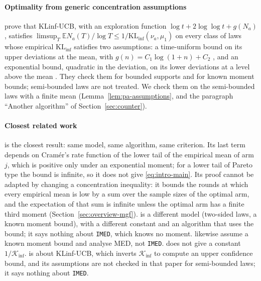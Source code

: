 \documentclass[11pt]{article}
\newcommand{\E}{\mathbb{E}}
\begin{document}
\paragraph{Optimality from generic concentration assumptions} \citet[Theorem~3.1]{PA26} prove that
KLinf-UCB, with an exploration function $\log t+2\log\log t+g(N_a)$, satisfies
$\limsup_T\E N_a(T)/\log T\le1/\mathrm{KL}_{\inf}(\nu_a,\mu_1)$ on every class of laws whose
empirical $\mathrm{KL}_{\inf}$ satisfies two assumptions: a time-uniform bound on its upper
deviations at the mean, with $g(n)=C_1\log(1+n)+C_2$ \citep[Assumption~2.3]{PA26}, and an
exponential bound, quadratic in the deviation, on its lower deviations at a level above the mean
\citep[Assumption~2.4]{PA26}. They check them for bounded supports and for known moment bounds;
semi-bounded laws are not treated. We check them on the semi-bounded laws with a finite mean
(Lemma~\ref{lem:pa-assumptions}, and the paragraph ``Another algorithm'' of
Section~\ref{sec:counter}).

\paragraph{Closest related work} \citet[Theorem~3]{HT15} is the closest result: same model, same
algorithm, same criterion. Its last term depends on Cram\'er's rate function of the lower tail of
the empirical mean of arm $j$, which is positive only under an exponential moment; for a lower tail
of Pareto type the bound is infinite, so it does not give \eqref{eq:intro-main}. Its proof cannot be
adapted by changing a concentration inequality: it bounds the rounds at which every empirical mean is
low by a sum over the sample sizes of the optimal arm, and the expectation of that sum is infinite
unless the optimal arm has a finite third moment (Section~\ref{sec:overview-mgf}).
\citet[Corollary~2]{AJK21} is a different model (two-sided laws, a known moment bound), with a
different constant and an algorithm that uses the bound; it says nothing about \texttt{IMED}, which
knows no moment. \citet[Section~4.4]{BSH23} likewise assume a known moment bound and analyse MED,
not \texttt{IMED}. \citet[Theorem~1]{BCL13} does not give a constant $1/\mathcal K_{\inf}$.
\citet[Theorem~3.1]{PA26} is about KLinf-UCB, which inverts $\mathcal K_{\inf}$ to compute an upper
confidence bound, and its assumptions are not checked in that paper for semi-bounded laws; it says
nothing about \texttt{IMED}.
\end{document}
